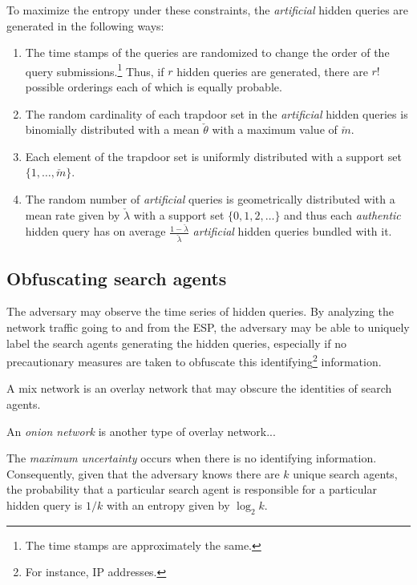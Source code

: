 \documentclass[final,11pt]{article}
\renewcommand{\vec}[1]{\boldsymbol{\mathbf{#1}}}
\numberwithin{equation}{section}
\theoremstyle{plain}
\theoremstyle{remark}
\begin{document}
To maximize the entropy under these constraints, the \emph{artificial} hidden queries are generated in the following ways:
\begin{enumerate}
\item The time stamps of the queries are randomized to change the order of the query submissions.\footnote{The time stamps are approximately the same.} Thus, if $r$ hidden queries are generated, there are $r!$ possible orderings each of which is equally probable.
\item The random cardinality of each trapdoor set in the \emph{artificial} hidden queries is binomially distributed with a mean $\check{\theta}$ with a maximum value of $\check{m}$.
\item Each element of the trapdoor set is uniformly distributed with a support set $\{1,\ldots,\check{m}\}$.
\item The random number of \emph{artificial} queries is geometrically distributed with a mean rate given by $\check{\lambda}$ with a support set $\{0,1,2,\ldots\}$ and thus each \emph{authentic} hidden query has on average $\frac{1-\check{\lambda}}{\check{\lambda}}$ \emph{artificial} hidden queries bundled with it.
\end{enumerate}

\subsection{Obfuscating search agents}

The adversary may observe the time series of hidden queries. By analyzing the network traffic going to and from the ESP, the adversary may be able to uniquely label the search agents generating the hidden queries, especially if no precautionary measures are taken to obfuscate this identifying\footnote{For instance, IP addresses.} information.

A mix network\cite{chaum1981untraceable} is an overlay network that may obscure the identities of search agents.

An \emph{onion network} is another type of overlay network...

The \emph{maximum uncertainty} occurs when there is no identifying information. Consequently, given that the adversary knows there are $k$ unique search agents, the probability that a particular search agent is responsible for a particular hidden query is $1 / k$ with an entropy given by $\log_2 k$.
\end{document}
